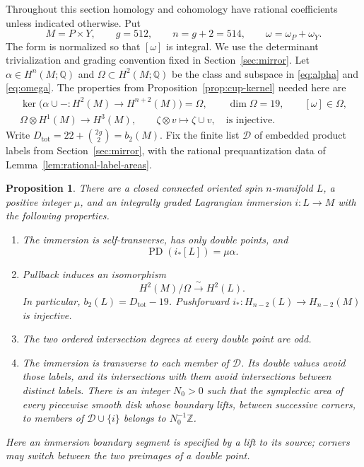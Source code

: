 \documentclass[11pt]{article}
\numberwithin{equation}{section}
\newtheorem{proposition}[theorem]{Proposition}
\theoremstyle{definition}
\theoremstyle{remark}
\newcommand{\Q}{\mathbb Q}
\newcommand{\Z}{\mathbb Z}
\newcommand{\PD}{\operatorname{PD}}
\begin{document}
Throughout this section homology and cohomology have rational coefficients
unless indicated otherwise.  Put
\[
 M=P\times Y,\qquad g=512,\qquad n=g+2=514,
 \qquad \omega=\omega_P+\omega_Y.
\]
The form is normalized so that $[\omega]$ is integral.  We use the
determinant trivialization and grading convention fixed in
Section~\ref{sec:mirror}.  Let $\alpha\in H^n(M;\Q)$ and
$\Omega\subset H^2(M;\Q)$ be the class and subspace in
\eqref{eq:alpha} and \eqref{eq:omega}.  The properties from
Proposition~\ref{prop:cup-kernel} needed here are
\begin{equation}\label{top:eq:inputs}
 \begin{gathered}
 \ker\bigl(\alpha\cup-:H^2(M)\longrightarrow H^{n+2}(M)\bigr)=\Omega,
 \qquad \dim\Omega=19,\qquad [\omega]\in\Omega,\\
 \Omega\otimes H^1(M)\longrightarrow H^3(M),
 \qquad \zeta\otimes v\longmapsto\zeta\cup v,
 \quad\text{is injective}.
 \end{gathered}
\end{equation}
Write $D_{\mathrm{tot}}=22+\binom{2g}{2}=b_2(M)$.  Fix the finite
list $\mathcal D$ of embedded product labels from
Section~\ref{sec:mirror}, with the rational prequantization data of
Lemma~\ref{lem:rational-label-areas}.

\begin{proposition}\label{prop:immersion}
There are a closed connected oriented spin $n$-manifold $L$, a positive
integer $\mu$, and an integrally graded Lagrangian immersion $i:L\to M$
with the following properties.
\begin{enumerate}[label=\textup{(\roman*)}]
 \item The immersion is self-transverse, has only double points, and
 \[
       \PD(i_*[L])=\mu\alpha.
 \]
 \item Pullback induces an isomorphism
 \[
       H^2(M)/\Omega\xrightarrow{\ \sim\ }H^2(L).
 \]
 In particular, $b_2(L)=D_{\mathrm{tot}}-19$.  Pushforward
 $i_*:H_{n-2}(L)\to H_{n-2}(M)$ is injective.
 \item The two ordered intersection degrees at every double point are
 odd.
 \item The immersion is transverse to each member of $\mathcal D$.
 Its double values avoid those labels, and its intersections with them
 avoid intersections between distinct labels.  There is an integer
 $N_0>0$ such that the symplectic area of every piecewise smooth disk
 whose boundary lifts, between successive corners, to members of
 $\mathcal D\cup\{i\}$ belongs to $N_0^{-1}\Z$.
\end{enumerate}
Here an immersion boundary segment is specified by a lift to its source;
corners may switch between the two preimages of a double point.
\end{proposition}
\end{document}
